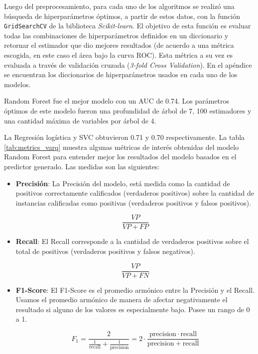 Luego del preprocesamiento, para cada uno de los algoritmos se realizó una búsqueda de hiperparámetros óptimos, a partir de estos datos, con la función \texttt{GridSearchCV} de la biblioteca \textit{Scikit-learn}. El objetivo de esta función es evaluar todas las combinaciones de hiperparámetros definidos en un diccionario y retornar el estimador que dio mejores resultados (de acuerdo a una métrica escogida, en este caso el área bajo la curva ROC). Esta métrica a su vez es evaluada a través de validación cruzada (\textit{3-fold Cross Validation}). En el apéndice se encuentran los diccionarios de hiperparámetros usados en cada uno de los modelos.

Random Forest fue el mejor modelo con un AUC de 0.74. Los parámetros óptimos de este modelo fueron una profundidad de árbol de 7, 100 estimadores y una cantidad máxima de variables por árbol de 4.

La Regresión logística y SVC obtuvieron 0.71 y 0.70 respectivamente. La tabla \ref{tab:metrics_varq} muestra algunas métricas de interés obtenidas del modelo Random Forest para entender mejor los resultados del modelo basados en el predictor generado. Las medidas son las siguientes:

\begin{itemize}
    \item \textbf{Precisión}: La Precisión del modelo, está medida como la cantidad de positivos correctamente calificados (verdaderos positivos) sobre la cantidad de instancias calificadas como positivas (verdaderos positivos y falsos positivos).
    
    \begin{equation*}
        \frac{VP}{VP + FP}
    \end{equation*}
    
    \item \textbf{Recall}: El Recall corresponde a la cantidad de verdaderos positivos sobre el total de positivos (verdaderos positivos y falsos negativos).
    
    \begin{equation*}
        \frac{VP}{VP + FN}
    \end{equation*}
    
    \item \textbf{F1-Score}: El F1-Score es el promedio armónico entre la Precisión y el Recall. Usamos el promedio armónico de manera de afectar negativamente el resultado si alguno de los valores es especialmente bajo. Posee un rango de 0 a 1. 
    
    \begin{equation*}
        F_1 = \frac{2}{\tfrac{1}{\mathrm{recall}} + \tfrac{1}{\mathrm{precision}}} = 2 \cdot \frac{\mathrm{precision} \cdot \mathrm{recall}}{\mathrm{precision} + \mathrm{recall}}
    \end{equation*}
    
\end{itemize}

